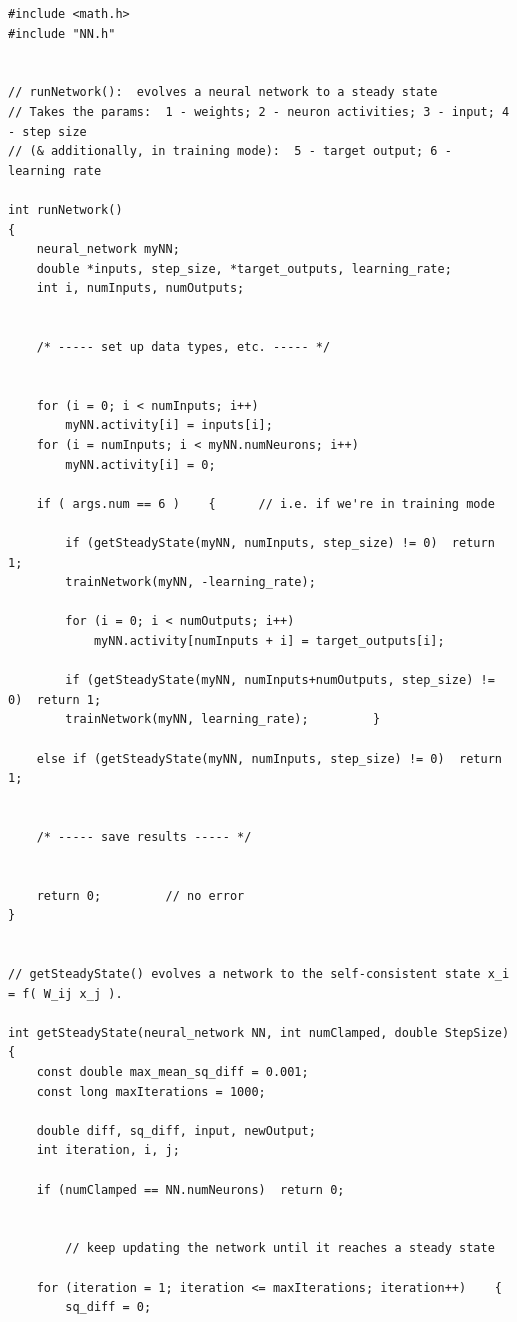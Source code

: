 \documentclass{article}
\newenvironment{longcode}{
       \begin{list}{}{
               \setlength{\leftmargin}{0in}
               \setlength{\rightmargin}{0in}
               \setlength{\topsep}{.2in}
       }
       \small
       \item[] }
       { \end{list}   }
\begin{document}
\begin{longcode} \begin{verbatim}
#include <math.h>
#include "NN.h"


// runNetwork():  evolves a neural network to a steady state
// Takes the params:  1 - weights; 2 - neuron activities; 3 - input; 4 - step size
// (& additionally, in training mode):  5 - target output; 6 - learning rate

int runNetwork()
{
    neural_network myNN;
    double *inputs, step_size, *target_outputs, learning_rate;
    int i, numInputs, numOutputs;
    
    
    /* ----- set up data types, etc. ----- */
    
    
    for (i = 0; i < numInputs; i++)
        myNN.activity[i] = inputs[i];
    for (i = numInputs; i < myNN.numNeurons; i++)
        myNN.activity[i] = 0;
    
    if ( args.num == 6 )    {      // i.e. if we're in training mode
        
        if (getSteadyState(myNN, numInputs, step_size) != 0)  return 1;
        trainNetwork(myNN, -learning_rate);
        
        for (i = 0; i < numOutputs; i++)
            myNN.activity[numInputs + i] = target_outputs[i];
        
        if (getSteadyState(myNN, numInputs+numOutputs, step_size) != 0)  return 1;
        trainNetwork(myNN, learning_rate);         }
    
    else if (getSteadyState(myNN, numInputs, step_size) != 0)  return 1;
    
    
    /* ----- save results ----- */
    
    
    return 0;         // no error
}


// getSteadyState() evolves a network to the self-consistent state x_i = f( W_ij x_j ).

int getSteadyState(neural_network NN, int numClamped, double StepSize)
{
    const double max_mean_sq_diff = 0.001;
    const long maxIterations = 1000;
    
    double diff, sq_diff, input, newOutput;
    int iteration, i, j;
    
    if (numClamped == NN.numNeurons)  return 0;
    
    
        // keep updating the network until it reaches a steady state
    
    for (iteration = 1; iteration <= maxIterations; iteration++)    {
        sq_diff = 0;
        

\end{verbatim}
\end{longcode}
\end{document}
